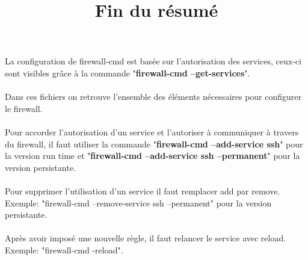 \documentclass[12pt, a4paper]{article}
\begin{document}
La configuration de firewall-cmd est basée sur l'autorisation des services, ceux-ci sont visibles grâce à la commande "\textbf{firewall-cmd --get-services}".\\
\\
Dans ces fichiers on retrouve l'ensemble des éléments nécessaires pour configurer le firewall.\\
\\
Pour accorder l'autorisation d'un service et l'autoriser à communiquer à travers du firewall, il faut utiliser la commande "\textbf{firewall-cmd --add-service ssh}" pour la version run time et "\textbf{firewall-cmd --add-service ssh --permanent}" pour la version persistante.\\
\\
Pour supprimer l'utilisation d'un service il faut remplacer add par remove.\\
Exemple: "firewall-cmd --remove-service ssh --permanent" pour la version persistante.\\
\\
Après avoir imposé une nouvelle règle, il faut relancer le service avec reload.\\
Exemple: "firewall-cmd -reload".\\
\newpage\vspace*{12cm}
\begin{center}
\title{\Huge\textbf{\fontsize{40}{44}\selectfont Fin du résumé}}
\date{}
\maketitle
\end{center}
\end{document}
